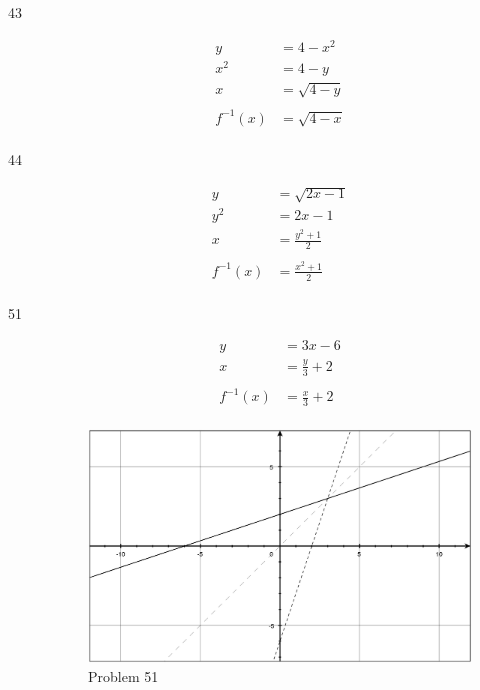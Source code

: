 \documentclass{exam}
\begin{document}
\begin{description}
    \item[43]
      \begin{align*}
        y   &= 4 - x^2 \\
        x^2 &= 4 - y \\
        x   &= \sqrt{4 - y} \\
        \\
        f^{-1}(x) &= \sqrt{4 - x} \\
      \end{align*}

    \item[44]
      \begin{align*}
        y   &= \sqrt{2x - 1} \\
        y^2 &= 2x - 1 \\
        x &= \frac{y^2 + 1}{2} \\
        \\
        f^{-1}(x) &= \frac{x^2 + 1}{2} \\
      \end{align*}

\pagebreak

    \item[51]
      \begin{align*}
        y &= 3x - 6 \\
        x &= \frac{y}{3} + 2 \\
        \\
        f^{-1}(x) &= \frac{x}{3} + 2 \\
      \end{align*}

      \begin{figure}[H]
        \centering
        \includegraphics[scale=.3]{problem_51.eps}
        \caption*{Problem 51}
      \end{figure}
    

\end{description}
\end{document}
